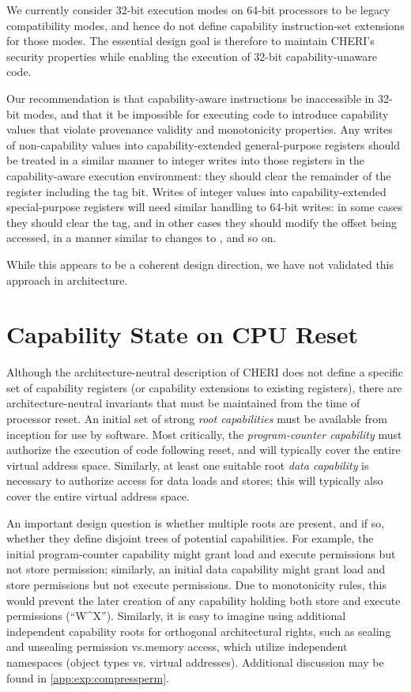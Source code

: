 We currently consider 32-bit execution modes on 64-bit processors to be legacy
compatibility modes, and hence do not define capability instruction-set
extensions for those modes.
The essential design goal is therefore to maintain CHERI's security properties
while enabling the execution of 32-bit capability-unaware code.

Our recommendation is that capability-aware instructions be inaccessible in
32-bit modes, and that it be impossible for executing code to introduce
capability values that violate provenance validity and monotonicity
properties.
Any writes of non-capability values into capability-extended general-purpose
registers should be treated in a similar manner to integer writes into those
registers in the capability-aware execution environment: they should clear the
remainder of the register including the tag bit.
Writes of integer values into capability-extended special-purpose registers
will need similar handling to 64-bit writes: in some cases they should clear
the tag, and in other cases they should modify the offset being accessed, in
a manner similar to changes to \PC{}, and so on.

While this appears to be a coherent design direction, we have not validated
this approach in architecture.

\section{Capability State on CPU Reset}
\label{sec:capability-state-on-cpu-reset}

Although the architecture-neutral description of CHERI does not define a
specific set of capability registers (or capability extensions to existing
registers), there are architecture-neutral invariants that must be maintained
from the time of processor reset.
An initial set of strong \textit{root capabilities} must be available from
inception for use by software.
Most critically, the \textit{program-counter capability} must authorize the
execution of code following reset, and will typically cover the entire virtual
address space.
Similarly, at least one suitable root \textit{data capability} is necessary to
authorize access for data loads and stores; this will typically also cover the
entire virtual address space.

An important design question is whether multiple roots are present, and if so,
whether they define disjoint trees of potential capabilities.
For example, the initial program-counter capability might grant load and
execute permissions but not store permission; similarly, an initial data
capability might grant load and store permissions but not execute permissions.
Due to monotonicity rules, this would prevent the later creation of any
capability holding both store and execute permissions (``W\^{}X'').
Similarly, it is easy to imagine using additional independent capability roots
for orthogonal architectural rights, such as sealing and unsealing permission
vs.\@ memory access, which utilize independent namespaces (object types vs.\@
virtual addresses).  Additional discussion may be found in
\cref{app:exp:compressperm}.

